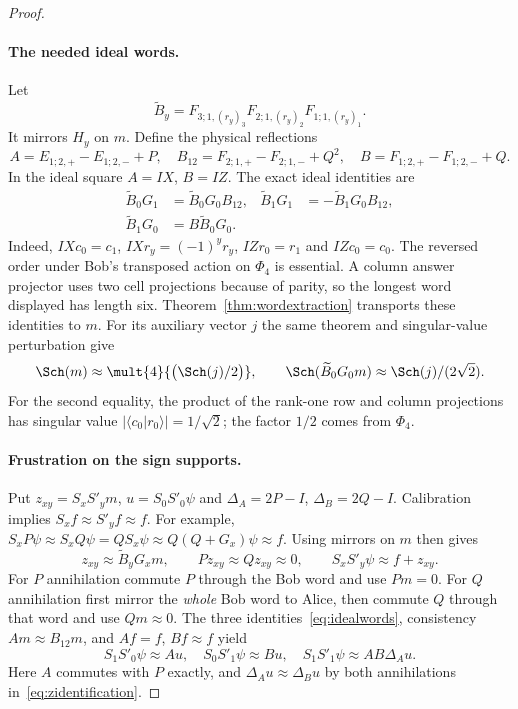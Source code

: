 \begin{proof}
\paragraph{The needed ideal words.}
Let
\[
\widetilde B_y=F_{3;1,(r_y)_3}F_{2;1,(r_y)_2}F_{1;1,(r_y)_1}.
\]
It mirrors $H_y$ on $m$. Define the physical reflections
\[
A=E_{1;2,+}-E_{1;2,-}+P,\quad
B_{12}=F_{2;1,+}-F_{2;1,-}+Q^2,\quad
B=F_{1;2,+}-F_{1;2,-}+Q.
\]
In the ideal square $A=IX$, $B=IZ$. The exact ideal identities are
\begin{align}\label{eq:idealwords}
\widetilde B_0G_1&=\widetilde B_0G_0B_{12},&
\widetilde B_1G_1&=-\widetilde B_1G_0B_{12},\nonumber\\
\widetilde B_1G_0&=B\widetilde B_0G_0.&&
\end{align}
Indeed, $IXc_0=c_1$, $IXr_y=(-1)^yr_y$, $IZr_0=r_1$ and $IZc_0=c_0$.
The reversed order under Bob's transposed action on $\Phi_4$ is essential.
A column answer projector uses two cell projections because of parity,
so the longest word displayed has length six.
Theorem~\ref{thm:wordextraction} transports these identities to $m$.
For its auxiliary vector $j$ the same theorem and singular-value
perturbation give
\begin{equation}\label{eq:robustnormalizations}
\Sch(m)\approx\mult{4}{\bigl(\Sch(j)/2\bigr)},\qquad
\Sch(\widetilde B_0G_0m)\approx\Sch(j)/(2\sqrt2).
\end{equation}
For the second equality, the product of the rank-one row and column
projections has singular value $|\langle c_0|r_0\rangle|=1/\sqrt2$;
the factor $1/2$ comes from $\Phi_4$.

\paragraph{Frustration on the sign supports.}
Put $z_{xy}=S_xS'_ym$, $u=S_0S'_0\psi$ and
$\Delta_A=2P-I$, $\Delta_B=2Q-I$. Calibration implies
$S_xf\approx S'_yf\approx f$. For example,
$S_xP\psi\approx S_xQ\psi=QS_x\psi\approx Q(Q+G_x)\psi\approx f$.
Using mirrors on $m$ then gives
\begin{equation}\label{eq:zidentification}
z_{xy}\approx\widetilde B_yG_xm,\qquad
Pz_{xy}\approx Qz_{xy}\approx0,\qquad
S_xS'_y\psi\approx f+z_{xy}.
\end{equation}
For $P$ annihilation commute $P$ through the Bob word and use $Pm=0$.
For $Q$ annihilation first mirror the \emph{whole} Bob word to Alice,
then commute $Q$ through that word and use $Qm\approx0$.
The three identities~\eqref{eq:idealwords}, consistency $Am\approx B_{12}m$,
and $Af=f$, $Bf\approx f$ yield
\begin{equation}\label{eq:signidentifications}
S_1S'_0\psi\approx Au,\quad S_0S'_1\psi\approx Bu,\quad
S_1S'_1\psi\approx AB\Delta_Au.
\end{equation}
Here $A$ commutes with $P$ exactly, and
$\Delta_Au\approx\Delta_Bu$ by both annihilations
in~\eqref{eq:zidentification}.


\end{proof}
